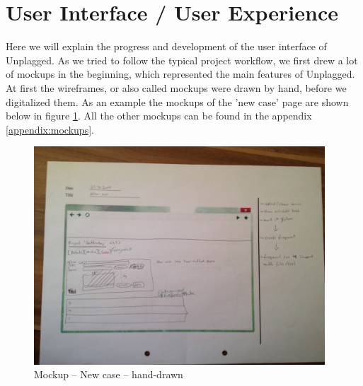\section{User Interface / User Experience}

Here we will explain the progress and development of the user interface of Unplagged. As we tried to follow the 
typical project workflow, we first drew a lot of mockups in the beginning, which represented the main features of 
Unplagged. At first the wireframes, or also called mockups were drawn by hand, before we digitalized them. As an example 
the mockups of the 'new case' page are shown below in figure \ref{fig:mNewCaseMockup}. All the other mockups can be found 
in the appendix \ref{appendix:mockups}.

\begin{figure}[htbp]
  \centering
    \includegraphics[width=0.97\textwidth]{mockups/m_new_case.jpg}
  \caption{Mockup -- New case -- hand-drawn}
  \label{fig:mNewCaseMockup}
\end{figure}

